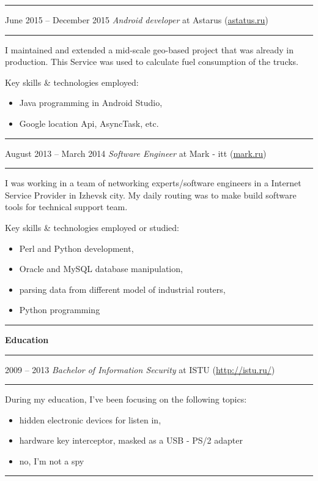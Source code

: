 \documentclass[11pt]{article}
\newcommand\CvSmallSkipLength{0.5em}
\newcommand\CvBigSkipLength{1em}
\newcommand\CvSkip[1]{\vspace{#1}}
\newcommand\CvSmallSkip{\CvSkip{\CvSmallSkipLength}}
\newcommand\CvBigSkip{\CvSkip{\CvBigSkipLength}}
\newcommand\CvSectionHeader[1]{\CvBigSkip\textbf{#1}\CvBigSkip}
\newcommand\CvRule{\begingroup\color{CvRuleColor}\hrule\endgroup}
\newcommand\CvWorkplaceHeader[5]{\begingroup%
  \CvRule%
  \fboxsep0pt%
  \colorbox{CvWorkplaceHeaderColor}{%
    \begin{minipage}{\linewidth-2\fboxsep}%
\CvSmallSkip%
#1 -- #2 \hfill \textit{#3} at #4 (\href{http://#5/}{#5})%
\CvSmallSkip%
    \end{minipage}%
  }%
  \CvRule%
\endgroup%
}
\newenvironment{CvWorkplaceDescription}{%
    \begingroup\setlength\parskip{\CvSmallSkipLength}%
  }{%
    \CvSmallSkip\endgroup%
  }
\begin{document}
\CvWorkplaceHeader{June 2015}{December 2015}{Android developer}{Astarus}{astatus.ru}

\begin{CvWorkplaceDescription}
I maintained and extended a mid-scale geo-based project that was already in production.
This Service was used to calculate fuel consumption of the trucks.

Key skills \& technologies employed:
\begin{itemize}[noitemsep]
  \item Java programming in Android Studio,
  \item Google location Api, AsyncTask, etc.
\end{itemize}
\end{CvWorkplaceDescription}

\CvWorkplaceHeader{August 2013}{March 2014}{Software Engineer}{Mark - itt}{mark.ru}

\begin{CvWorkplaceDescription}
I was working in a team of networking experts/software engineers in a Internet Service Provider in Izhevsk city. My daily routing was to make build software tools for technical support team.

Key skills \& technologies employed or studied:
\begin{itemize}[noitemsep]
  \item Perl and Python development,
  \item Oracle and MySQL database manipulation,
  \item parsing data from different model of industrial routers,
  \item Python programming
\end{itemize}
\end{CvWorkplaceDescription}
\CvRule

\CvSectionHeader{Education}

\CvWorkplaceHeader{2009}{2013}{Bachelor of Information Security}{ISTU}{http://istu.ru/}

\begin{CvWorkplaceDescription}
During my education, I've been focusing on the following topics:
\begin{itemize}[noitemsep]
  \item hidden electronic devices for listen in,
  \item hardware key interceptor, masked as a USB - PS/2 adapter
  \item no, I'm not a spy
\end{itemize}
\end{CvWorkplaceDescription}
\CvRule
\end{document}
